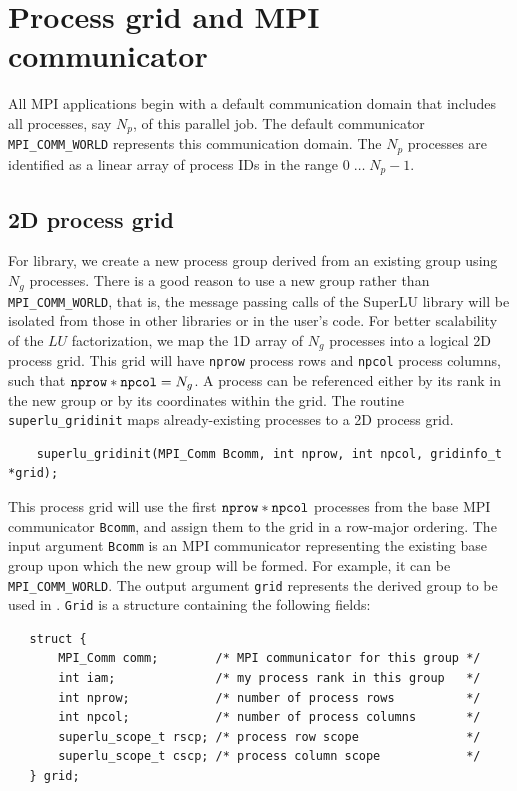 \section{Process grid and MPI communicator}
\label{sec:grid}
All MPI applications begin with a default communication domain
that includes all processes, say $N_p$, of this parallel job.
The default communicator {\tt MPI\_COMM\_WORLD} represents
this communication domain.
The $N_p$ processes are identified as a linear array of process IDs in the
range $0\;\ldots\;N_p-1$.

\subsection{2D process grid}
For {\superlud} library, we create a new process group derived from an
existing group using $N_g$ processes. There is a good
reason to use a new group rather than {\tt MPI\_COMM\_WORLD}, that is,
the message passing calls of the SuperLU library will be isolated
from those in other libraries or in the user's code.
For better scalability of the $LU$ factorization, we map the
1D array of $N_g$ processes into a logical 2D process grid.
This grid will have {\tt nprow} process rows and {\tt npcol} process columns,
such that ${\tt nprow} * {\tt npcol} = N_g$. A process can be referenced
either by its rank in the new group or by its coordinates within
the grid.
The routine {\tt superlu\_gridinit} maps already-existing processes
to a 2D process grid.

\begin{verbatim}
    superlu_gridinit(MPI_Comm Bcomm, int nprow, int npcol, gridinfo_t *grid);
\end{verbatim}

This process grid will use the first ${\tt nprow} * {\tt npcol}$
processes from the base MPI communicator {\tt Bcomm}, and assign them
to the grid in a row-major ordering.
The input argument {\tt Bcomm} is an MPI communicator
representing the existing base group upon which the new
group will be formed. For example, it can be
{\tt MPI\_COMM\_WORLD}. The output argument {\tt grid}
represents the derived group to be used in {\superlud}.
{\tt Grid} is a structure containing the following fields:
\begin{verbatim}
   struct {
       MPI_Comm comm;        /* MPI communicator for this group */
       int iam;              /* my process rank in this group   */
       int nprow;            /* number of process rows          */
       int npcol;            /* number of process columns       */
       superlu_scope_t rscp; /* process row scope               */
       superlu_scope_t cscp; /* process column scope            */
   } grid;
\end{verbatim}

